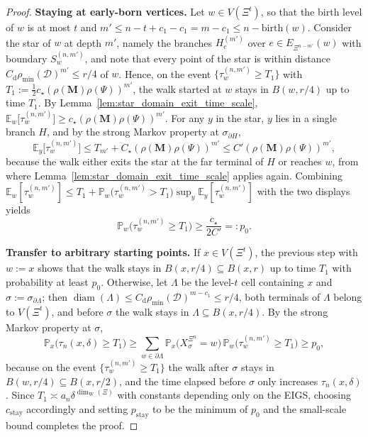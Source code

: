 \documentclass{article}
\theoremstyle{plain}
\theoremstyle{definition}
\newcommand{\dist}{\mathrm{d}}
\newcommand{\dimwalk}{\dim_\mathrm{W}}
\begin{document}
\begin{proof}
\textbf{Staying at early-born vertices.}
Let $w\in V(\Xi^{t})$, so that the birth level of $w$ is at most $t$ and $m'\le n-t+c_1-c_1= m-c_1\le n-\mathrm{birth}(w)$.
Consider the star of $w$ at depth $m'$, namely the branches $H_e^{(m')}$ over $e\in E_{\Xi^{n-m'}}(w)$ with boundary $S_w^{(n,m')}$, and note that every point of the star is within distance $C_{\dist}\rho_{\min}(\mathcal D)^{m'}\le r/4$ of $w$.
Hence, on the event $\{\tau_w^{(n,m')}\ge T_1\}$ with $T_1:=\tfrac12 c_\star(\rho(\mathbf M)\rho(\Psi))^{m'}$, the walk started at $w$ stays in $B(w,r/4)$ up to time $T_1$.
By Lemma~\ref{lem:star_domain_exit_time_scale}, $\mathbb E_w\bigl[\tau_w^{(n,m')}\bigr]\ge c_\star(\rho(\mathbf M)\rho(\Psi))^{m'}$.
For any $y$ in the star, $y$ lies in a single branch $H$, and by the strong Markov property at $\sigma_{\partial H}$,
\[
\mathbb E_y\bigl[\tau_w^{(n,m')}\bigr]
\le
T_{m'}+C_\star(\rho(\mathbf M)\rho(\Psi))^{m'}
\le
C'(\rho(\mathbf M)\rho(\Psi))^{m'},
\]
because the walk either exits the star at the far terminal of $H$ or reaches $w$, from where Lemma~\ref{lem:star_domain_exit_time_scale} applies again.
Combining $\mathbb E_w[\tau_w^{(n,m')}]\le T_1+\mathbb P_w\bigl(\tau_w^{(n,m')}>T_1\bigr)\sup_y\mathbb E_y[\tau_w^{(n,m')}]$ with the two displays yields
\[
\mathbb P_w\bigl(\tau_w^{(n,m')}\ge T_1\bigr)\ge\frac{c_\star}{2C'}=:p_0.
\]

\textbf{Transfer to arbitrary starting points.}
If $x\in V(\Xi^{t})$, the previous step with $w:=x$ shows that the walk stays in $B(x,r/4)\subseteq B(x,r)$ up to time $T_1$ with probability at least $p_0$.
Otherwise, let $\Lambda$ be the level-$t$ cell containing $x$ and $\sigma:=\sigma_{\partial\Lambda}$; then $\operatorname{diam}(\Lambda)\le C_{\dist}\rho_{\min}(\mathcal D)^{m-c_1}\le r/4$, both terminals of $\Lambda$ belong to $V(\Xi^{t})$, and before $\sigma$ the walk stays in $\Lambda\subseteq B(x,r/4)$.
By the strong Markov property at $\sigma$,
\[
\mathbb P_x\bigl(\tau_n(x,\delta)\ge T_1\bigr)
\ge
\sum_{w\in\partial\Lambda}\mathbb P_x\bigl(X^{\Xi^n}_{\sigma}=w\bigr)\,\mathbb P_w\bigl(\tau_w^{(n,m')}\ge T_1\bigr)
\ge
p_0,
\]
because on the event $\{\tau_w^{(n,m')}\ge T_1\}$ the walk after $\sigma$ stays in $B(w,r/4)\subseteq B(x,r/2)$, and the time elapsed before $\sigma$ only increases $\tau_n(x,\delta)$.
Since $T_1\asymp a_n\delta^{\dimwalk(\Xi)}$ with constants depending only on the EIGS, choosing $c_{\mathrm{stay}}$ accordingly and setting $p_{\mathrm{stay}}$ to be the minimum of $p_0$ and the small-scale bound completes the proof.%

\end{proof}
\end{document}

